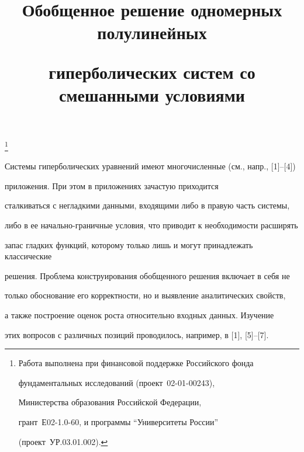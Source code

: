 \title{Обобщенное решение одномерных полулинейных


гиперболических систем со смешанными условиями}


\thanks{Работа выполнена при финансовой поддержке Российского фонда


фундаментальных исследований (проект \No\,02-01-00243), 


Министерства образования Российской Федерации, 


грант \No\,Е02-1.0-60, и программы ``Университеты России''


(проект \No\,УР.03.01.002).}





\date{}




\pagestyle{plain} %







\maketitle


\label{begin}








Системы гиперболических уравнений имеют многочисленные (см., напр., [1]--[4])


приложения. При этом в приложениях зачастую приходится 


сталкиваться с негладкими данными, входящими либо в правую часть системы,


либо в ее начально-граничные условия, что приводит к необходимости расширять


запас гладких функций, которому только лишь и могут принадлежать классические


решения.  Проблема конструирования обобщенного решения включает в себя не 


только обоснование его корректности, но и выявление аналитических свойств, 


а также построение оценок роста относительно входных данных. Изучение


этих вопросов с различных позиций проводилось, например, в [1], [5]--[7].





